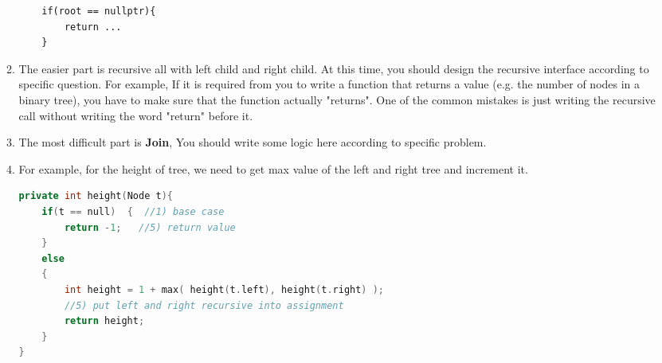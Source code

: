 \documentclass[a4paper,11pt,twoside]{book}
\begin{document}
\begin{itemize}
\begin{enumerate}
	
\begin{lstlisting}
	if(root == nullptr){
		return ...
	}
\end{lstlisting}
	
	\item The easier part is recursive all with left child and right child. At this time, you should design the recursive interface according to specific question. For example, If it is required from you to write a function that returns a value (e.g. the number of nodes in a binary tree), you have to make sure that the function actually "returns". One of the common mistakes is just writing the recursive call without writing the word "return" before it.
	
	\item The most difficult part is \textbf{Join}, You should write some logic here according to specific problem.
	
	\item For example, for the height of tree, we need to get max value of the left and right tree and increment it. 
\begin{lstlisting}[frame=single, language=c++]
private int height(Node t){
	if(t == null)  {  //1) base case
		return -1;   //5) return value 
	}
	else
	{
		int height = 1 + max( height(t.left), height(t.right) );
		//5) put left and right recursive into assignment
		return height;
	}
}		
\end{lstlisting}	
	
\end{enumerate}

\end{itemize}
\end{document}
